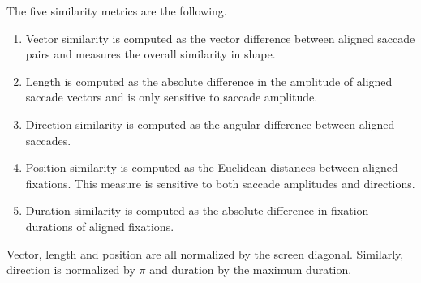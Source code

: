 \documentclass{article} %
\begin{document}
The five similarity metrics are the following. 
\begin{enumerate}
\item Vector  similarity is computed as the vector difference between aligned saccade pairs and measures the overall similarity in shape.

\item Length is computed as the absolute difference in the amplitude of aligned saccade vectors and is only sensitive to saccade amplitude.

\item Direction similarity is computed as the angular difference between aligned saccades.

\item Position similarity is computed as the Euclidean distances between aligned fixations. This measure is sensitive to both saccade amplitudes and directions. 

\item Duration similarity is computed as the absolute difference in fixation durations of aligned fixations.
\end{enumerate}
Vector, length and position are  all normalized by the screen diagonal. Similarly, direction is normalized by $\pi$ and duration by the maximum duration.
\end{document}
